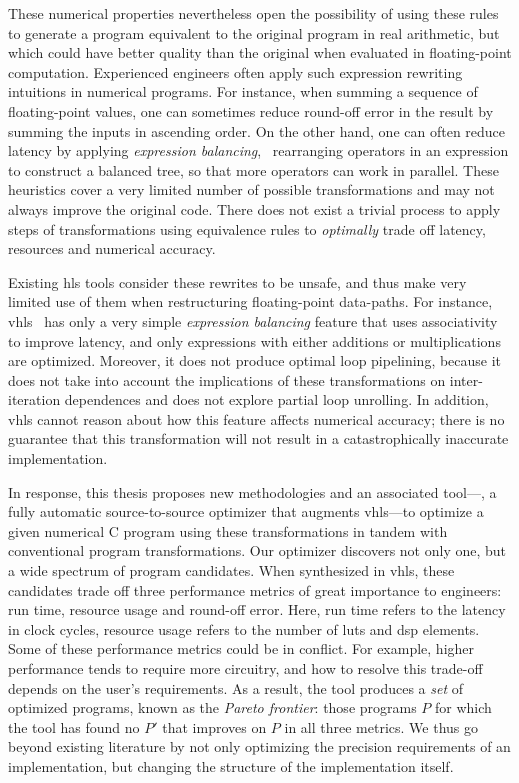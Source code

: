 These numerical properties nevertheless open the possibility of using these
rules to generate a program equivalent to the original program in real
arithmetic, but which could have better quality than the original when
evaluated in floating-point computation.  Experienced engineers often apply
such expression rewriting intuitions in numerical programs.  For instance,
when summing a sequence of floating-point values, one can sometimes reduce
round-off error in the result by summing the inputs in ascending order.  On
the other hand, one can often reduce latency by applying \emph{expression
balancing}, \ie~rearranging operators in an expression to construct a balanced
tree, so that more operators can work in parallel.  These heuristics cover a
very limited number of possible transformations and may not always improve
the original code.  There does not exist a trivial process to apply steps of
transformations using equivalence rules to \emph{optimally} trade off latency,
resources and numerical accuracy.

Existing \gls{hls} tools consider these rewrites to be unsafe, and thus make
very limited use of them when restructuring floating-point data-paths.  For
instance, \gls{vhls}~\cite{vivado_hls} has only a very simple \emph{expression
balancing} feature that uses associativity to improve latency, and only
expressions with either additions or multiplications are optimized.  Moreover,
it does not produce optimal loop pipelining, because it does not take
into account the implications of these transformations on inter-iteration
dependences and does not explore partial loop unrolling.  In addition,
\gls{vhls} cannot reason about how this feature affects numerical accuracy;
there is no guarantee that this transformation will not result in a
catastrophically inaccurate implementation.

In response, this thesis proposes new methodologies and an associated
tool---\soap, a fully automatic source-to-source optimizer that augments
\gls{vhls}---to optimize a given numerical C program using these
transformations in tandem with conventional program transformations.  Our
optimizer discovers not only one, but a wide spectrum of program candidates.
When synthesized in \gls{vhls}, these candidates trade off three performance
metrics of great importance to engineers: run time, resource usage and
round-off error.  Here, run time refers to the latency in clock cycles,
resource usage refers to the number of \glspl{lut} and \gls{dsp} elements.
Some of these performance metrics could be in conflict.  For example, higher
performance tends to require more circuitry, and how to resolve this trade-off
depends on the user's requirements.  As a result, the tool produces a
\emph{set} of optimized programs, known as the \emph{Pareto frontier}: those
programs $P$ for which the tool has found no $P'$ that improves on $P$ in all
three metrics.  We thus go beyond existing literature by not only optimizing
the precision requirements of an implementation, but changing the structure of
the implementation itself.

